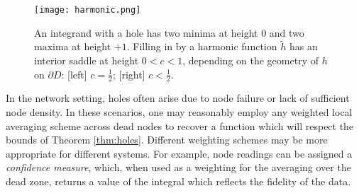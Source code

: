 \documentclass{psapm-l}
\theoremstyle{definition}
\theoremstyle{remark}
\numberwithin{equation}{section}
\begin{document}
\begin{figure}[hbt]
\begin{center}
\texttt{[image: harmonic.png]}
\caption{An integrand with a hole has two minima at height $0$ and two maxima at height $+1$. Filling in by a harmonic function $\widetilde{h}$ has an interior saddle at height $0<c<1$, depending on the geometry of $h$ on $\partial D$: [left] $c=\frac{1}{2}$; [right] $c<\frac{1}{2}$.}
\label{fig:harmonic}
\end{center}
\end{figure}

In the network setting, holes often arise due to node failure or lack of sufficient node density. In these scenarios, one may reasonably employ any weighted local averaging scheme across dead nodes to recover a function which will respect the bounds of Theorem \ref{thm:holes}. Different weighting schemes may be more appropriate for different systems. For example, node readings can be assigned a {\em confidence measure}, which, when used as a weighting for the averaging over the dead zone, returns a value of the integral which reflects the fidelity of the data.
\end{document}
